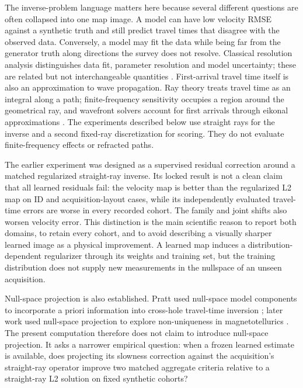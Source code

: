 \documentclass[11pt]{article}
\begin{document}
The inverse-problem language matters here because several different questions are often collapsed into one map image. A model can have low velocity RMSE against a synthetic truth and still predict travel times that disagree with the observed data. Conversely, a model may fit the data while being far from the generator truth along directions the survey does not resolve. Classical resolution analysis distinguishes data fit, parameter resolution and model uncertainty; these are related but not interchangeable quantities \cite{backus_gilbert_1968,menke_2012,aster_2018}. First-arrival travel time itself is also an approximation to wave propagation. Ray theory treats travel time as an integral along a path; finite-frequency sensitivity occupies a region around the geometrical ray, and wavefront solvers account for first arrivals through eikonal approximations \cite{vidale_1988,hole_1992,podvin_lecomte_1991,dahlen_2000,dahlen_resolution_2004}. The experiments described below use straight rays for the inverse and a second fixed-ray discretization for scoring. They do not evaluate finite-frequency effects or refracted paths.

The earlier experiment was designed as a supervised residual correction around a matched regularized straight-ray inverse. Its locked result is not a clean claim that all learned residuals fail: the velocity map is better than the regularized L2 map on ID and acquisition-layout cases, while its independently evaluated travel-time errors are worse in every recorded cohort. The family and joint shifts also worsen velocity error. This distinction is the main scientific reason to report both domains, to retain every cohort, and to avoid describing a visually sharper learned image as a physical improvement. A learned map induces a distribution-dependent regularizer through its weights and training set, but the training distribution does not supply new measurements in the nullspace of an unseen acquisition.

Null-space projection is also established. Pratt used null-space model components to incorporate a priori information into cross-hole travel-time inversion \cite{pratt_1997}; later work used null-space projection to explore non-uniqueness in magnetotellurics \cite{chave_2007}. The present computation therefore does not claim to introduce null-space projection. It asks a narrower empirical question: when a frozen learned estimate is available, does projecting its slowness correction against the acquisition's straight-ray operator improve two matched aggregate criteria relative to a straight-ray L2 solution on fixed synthetic cohorts?
\end{document}
